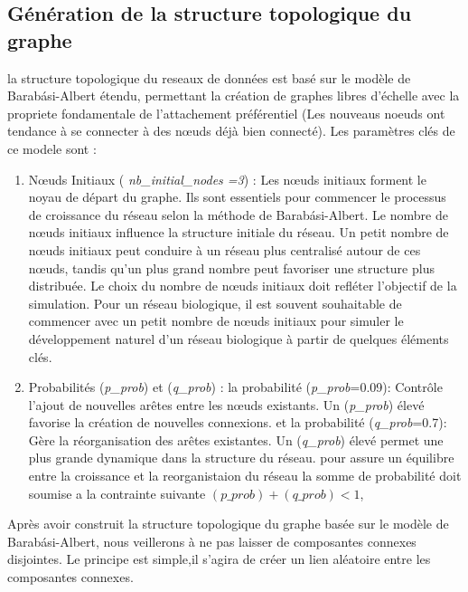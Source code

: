 \subsection{ Génération de la structure topologique du graphe}

la structure topologique du  reseaux de données  est   basé sur le modèle de Barabási-Albert étendu, permettant la création de graphes libres d'échelle avec la propriete fondamentale de l'attachement préférentiel (Les nouveaus noeuds  ont tendance à se connecter à des nœuds déjà bien connecté). Les paramètres clés de ce modele  sont :

\begin{enumerate}
    \item Nœuds Initiaux ( \textit{nb\_initial\_nodes =3}) : 
     Les nœuds initiaux forment le noyau de départ du graphe. Ils sont essentiels pour commencer le processus de croissance du réseau selon la méthode de Barabási-Albert. Le nombre de nœuds initiaux influence la structure initiale du réseau. Un petit nombre de nœuds initiaux peut conduire à un réseau plus centralisé autour de ces nœuds, tandis qu'un plus grand nombre peut favoriser une structure plus distribuée. Le choix du nombre de nœuds initiaux doit refléter l'objectif de la simulation. Pour un réseau biologique, il est souvent souhaitable de commencer avec un petit nombre de nœuds initiaux pour simuler le développement naturel d'un réseau biologique à partir de quelques éléments clés.
    
    \item Probabilités (\textit{p\_prob}) et (\textit{q\_prob}) : 
      la probabilité (\textit{p\_prob}=0.09): Contrôle l'ajout de nouvelles arêtes entre les nœuds existants. Un (\textit{p\_prob}) élevé favorise la création de nouvelles connexions.  et la probabilité  (\textit{q\_prob}=0.7): Gère la réorganisation des arêtes existantes. Un (\textit{q\_prob}) élevé permet une plus grande dynamique dans la structure du réseau.
      pour assure un équilibre entre la croissance et la reorganistaion du réseau la somme de probabilité doit soumise a  la contrainte suivante  \( (\textit{p\_prob})+ (\textit{q\_prob}) < 1 \),

\end{enumerate}
Après avoir construit la structure topologique du graphe basée sur le modèle de Barabási-Albert, nous veillerons à ne pas laisser de composantes connexes disjointes. Le principe est simple,il s'agira de créer un lien aléatoire entre les composantes connexes.

